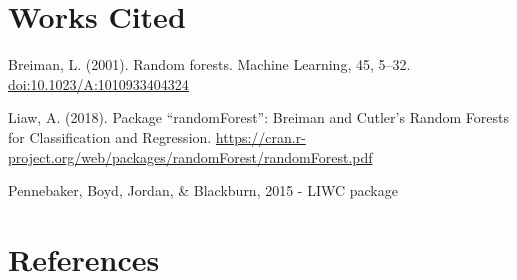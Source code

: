 \documentclass[acmart]{apa6}
\theoremstyle{definition}
\theoremstyle{definition}
\theoremstyle{definition}
\theoremstyle{remark}
\begin{document}
\newpage

\section{Works Cited}\label{works-cited}

Breiman, L. (2001). Random forests. Machine Learning, 45, 5--32.
\url{doi:10.1023/A:1010933404324}

Liaw, A. (2018). Package \enquote{randomForest}: Breiman and Cutler's
Random Forests for Classification and Regression.
\url{https://cran.r-project.org/web/packages/randomForest/randomForest.pdf}

Pennebaker, Boyd, Jordan, \& Blackburn, 2015 - LIWC package

\section{References}\label{references}

\begingroup
\setlength{\parindent}{-0.5in} \setlength{\leftskip}{0.5in}

\hypertarget{refs}{}

\endgroup
\end{document}

